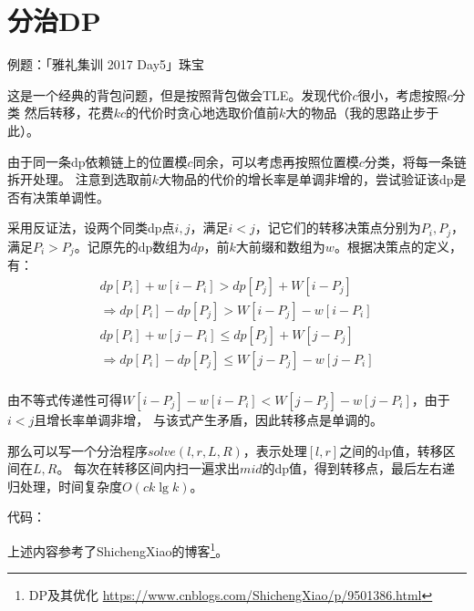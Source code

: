 \section{分治DP}
例题：「雅礼集训 2017 Day5」珠宝

这是一个经典的背包问题，但是按照背包做会TLE。发现代价$c$很小，考虑按照$c$分类
然后转移，花费$kc$的代价时贪心地选取价值前$k$大的物品（我的思路止步于此）。

由于同一条dp依赖链上的位置模$c$同余，可以考虑再按照位置模$c$分类，将每一条链拆开处理。
注意到选取前$k$大物品的代价的增长率是单调非增的，尝试验证该dp是否有决策单调性。

采用反证法，设两个同类dp点$i,j$，满足$i<j$，记它们的转移决策点分别为$P_i,P_j$，
满足$P_i>P_j$。记原先的dp数组为$dp$，前$k$大前缀和数组为$w$。根据决策点的定义，有：
\begin{eqnarray*}
    dp[P_i]+w[i-P_i]>dp[P_j]+W[i-P_j]\\
    \Rightarrow dp[P_i]-dp[P_j]>W[i-P_j]-w[i-P_i]\\
    dp[P_i]+w[j-P_i]\leq dp[P_j]+W[j-P_j]\\
    \Rightarrow dp[P_i]-dp[P_j]\leq W[j-P_j]-w[j-P_i]\\
\end{eqnarray*}

由不等式传递性可得$W[i-P_j]-w[i-P_i]<W[j-P_j]-w[j-P_i]$，由于$i<j$且增长率单调非增，
与该式产生矛盾，因此转移点是单调的。

那么可以写一个分治程序$solve(l,r,L,R)$，表示处理$[l,r]$之间的dp值，转移区间在$L,R$。
每次在转移区间内扫一遍求出$mid$的dp值，得到转移点，最后左右递归处理，时间复杂度$O(ck\lg k)$。

代码：


上述内容参考了ShichengXiao的博客\footnote{
    DP及其优化
    \url{https://www.cnblogs.com/ShichengXiao/p/9501386.html}
}。
